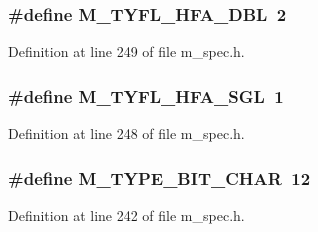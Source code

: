 \subsubsection{\setlength{\rightskip}{0pt plus 5cm}\#define M\_\-TYFL\_\-HFA\_\-DBL~2}\label{m__spec_8h_47b5e09e9773ecea6c716461e87334f9}




Definition at line 249 of file m\_\-spec.h.
\subsubsection{\setlength{\rightskip}{0pt plus 5cm}\#define M\_\-TYFL\_\-HFA\_\-SGL~1}\label{m__spec_8h_9e8b8efd7f400a50eeb2c7bc654c3914}




Definition at line 248 of file m\_\-spec.h.
\subsubsection{\setlength{\rightskip}{0pt plus 5cm}\#define M\_\-TYPE\_\-BIT\_\-CHAR~12}\label{m__spec_8h_38719ac1d08d40fbf229ed855cc1a7a5}




Definition at line 242 of file m\_\-spec.h.


